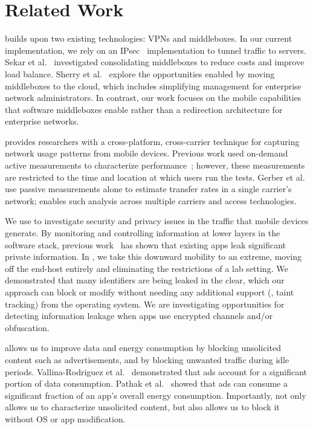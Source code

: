 \section{Related Work}
\label{sec:rw}
\meddle builds upon two existing technologies: VPNs and middleboxes. 
In our current implementation, we rely on an IPsec~\cite{rfc:ipsec} implementation 
to tunnel traffic to \meddle servers. Sekar et al.~\cite{sekar:middleboxes} investigated consolidating middleboxes 
to reduce costs and improve load balance. Sherry et al.~\cite{sherry:middleboxes} explore the opportunities 
enabled by moving middleboxes to the cloud, which includes simplifying management 
for enterprise network administrators. In contrast, our work focuses on the mobile capabilities 
that software middleboxes enable rather than a redirection architecture for enterprise networks. 

\meddle provides researchers with a cross-platform, cross-carrier technique 
for capturing network usage patterns from mobile devices. Previous work 
used on-demand active measurements to characterize performance~\cite{wang:middleboxes,speedtest}; 
however, these measurements are restricted to the time and location at which users run 
the tests. Gerber et al.~\cite{gerber:passivespeed} use passive measurements alone 
to estimate transfer rates in a single carrier's network; \meddle 
enables such analysis across multiple carriers and access technologies.

We use \meddle to investigate security and privacy issues in the 
traffic that mobile devices generate. By monitoring and controlling 
information at lower layers in the software stack, previous work~\cite{enck:taintdroid,hornyack:appfence,wsj:apps-watching-you} has shown 
that existing apps leak significant private information. In \meddle, we take 
this downward mobility to an extreme, moving off the end-host entirely and 
eliminating the restrictions of a lab setting. We demonstrated that  
many identifiers are being leaked in the clear, which our approach can 
block or modify without needing any additional support (\eg, taint tracking) 
from the operating system. We are investigating 
opportunities for detecting information leakage when apps use encrypted 
channels and/or obfuscation.

\meddle allows us to improve data and energy consumption by blocking 
unsolicited content such as advertisements, and by blocking unwanted 
traffic during idle periods. Vallina-Rodriguez et al.~\cite{vallina-rod:ads} demonstrated 
that ads account for a significant portion of data consumption. Pathak et al.~\cite{pathak:eprof} 
showed that ads can consume a significant fraction of an app's overall energy consumption. 
Importantly, \meddle not only allows us to characterize unsolicited content, but 
also allows us to block it without OS or app modification.

